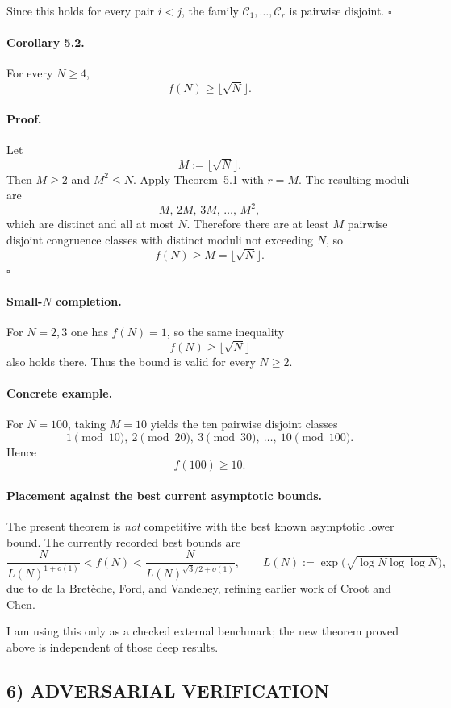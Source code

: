 Since this holds for every pair $i<j$, the family $\mathcal{C}_1,\dots,\mathcal{C}_r$ is pairwise disjoint.
\hfill $\square$

\paragraph{Corollary 5.2.}
For every $N\ge 4$,
\[
f(N)\ge \lfloor \sqrt N\rfloor.
\]

\paragraph{Proof.}
Let
\[
M:=\lfloor \sqrt N\rfloor.
\]
Then $M\ge 2$ and $M^2\le N$. Apply Theorem~5.1 with $r=M$. The resulting moduli are
\[
M,\,2M,\,3M,\,\dots,\,M^2,
\]
which are distinct and all at most $N$. Therefore there are at least $M$ pairwise disjoint congruence classes with distinct moduli not exceeding $N$, so
\[
f(N)\ge M=\lfloor \sqrt N\rfloor.
\]
\hfill $\square$

\paragraph{Small-$N$ completion.}
For $N=2,3$ one has $f(N)=1$, so the same inequality
\[
f(N)\ge \lfloor \sqrt N\rfloor
\]
also holds there. Thus the bound is valid for every $N\ge 2$.

\paragraph{Concrete example.}
For $N=100$, taking $M=10$ yields the ten pairwise disjoint classes
\[
1 \pmod{10},\ 2 \pmod{20},\ 3 \pmod{30},\ \dots,\ 10 \pmod{100}.
\]
Hence
\[
f(100)\ge 10.
\]

\paragraph{Placement against the best current asymptotic bounds.}
The present theorem is \emph{not} competitive with the best known asymptotic lower bound. The currently recorded best bounds are
\[
\frac{N}{L(N)^{1+o(1)}}<f(N)<\frac{N}{L(N)^{\sqrt 3/2+o(1)}},
\qquad
L(N):=\exp\!\big(\sqrt{\log N\log\log N}\big),
\]
due to de la Bret\`eche, Ford, and Vandehey, refining earlier work of Croot and Chen.

I am using this only as a checked external benchmark; the new theorem proved above is independent of those deep results.

\subsection*{6) ADVERSARIAL VERIFICATION}

